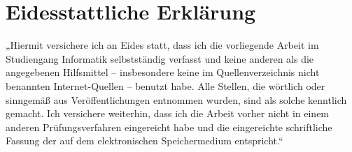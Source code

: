 \documentclass[
  twoside,
  11pt, a4paper,
  footinclude=true,
  headinclude=true,
  cleardoublepage=empty
]{scrreprt}
\begin{document}
\chapter*{Eidesstattliche Erklärung}
\onehalfspace
„Hiermit versichere ich an Eides statt, dass ich die vorliegende Arbeit im
Studiengang Informatik selbstständig verfasst und keine anderen als die
angegebenen Hilfsmittel – insbesondere keine im Quellenverzeichnis nicht
benannten Internet-Quellen – benutzt habe. Alle Stellen, die wörtlich oder
sinngemäß aus Veröffentlichungen entnommen wurden, sind als solche kenntlich
gemacht. Ich versichere weiterhin, dass ich die Arbeit vorher nicht in einem
anderen Prüfungsverfahren eingereicht habe und die eingereichte schriftliche
Fassung der auf dem elektronischen Speichermedium entspricht.“
\singlespace
\end{document}
